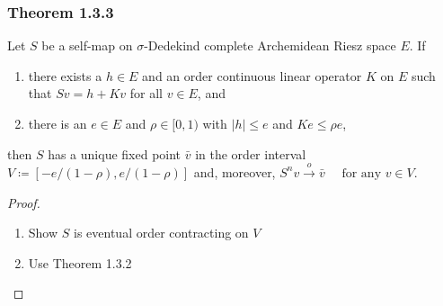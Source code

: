 \documentclass[11pt,xcolor={dvipsnames},hyperref={pdftex,pdfpagemode=UseNone,hidelinks,pdfdisplaydoctitle=true},usepdftitle=false]{beamer}
\newcommand{\too}{\stackrel { o } {\to} }
\begin{document}
\begin{frame}
\frametitle{Theorem 1.3.3}
Let $S$ be a self-map on $\sigma$-Dedekind complete Archemidean Riesz space $E$.  If 
    \begin{enumerate}
        \item there exists a $h \in E$ and an order continuous linear operator $K$ on
            $E$ such that $Sv = h + Kv$ for all $v \in E$, and
        \item there is an $e \in E$ and $\rho \in [0, 1)$ with $|h| \leq e$ and
            $Ke \leq \rho e$,
    \end{enumerate}
    then $S$ has a unique fixed point $\bar v$ in the order interval $V \coloneq
    [-e/(1-\rho), e/(1-\rho)]$ and, moreover,
$
S^n v \too \bar v 
        \quad \text{ for any }
        v \in V. 
$
\begin{proof}
\begin{enumerate}
\item Show $S$ is eventual order contracting on $V$
\item Use Theorem 1.3.2
\end{enumerate}
\end{proof}
\end{frame}
\end{document}
